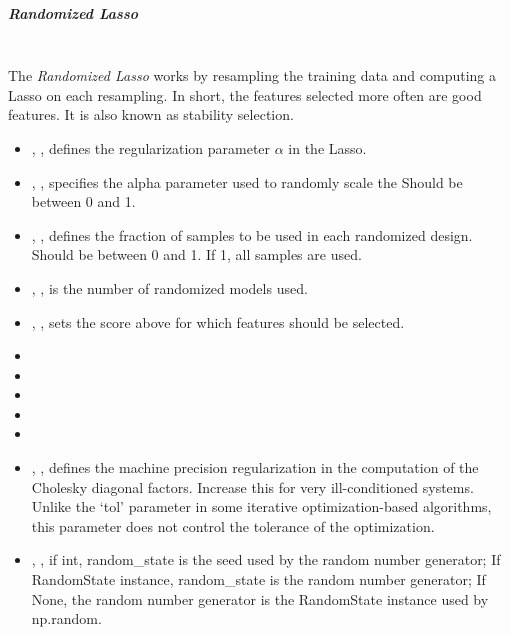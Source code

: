\subparagraph{Randomized Lasso}
\mbox{}
\\The \textit{Randomized Lasso} works by resampling the training data and
computing a Lasso on each resampling.
%
In short, the features selected more often are good features.
%
It is also known as stability selection.
%
\begin{itemize}
  \item {}, , defines the
  regularization parameter $\alpha$ in the Lasso.
  \item {}, , specifies the alpha
  parameter used to randomly scale the
  Should be between 0 and 1.
  \item {}, , defines
  the fraction of samples to be used in each randomized design.
  Should be between 0 and 1.
  If 1, all samples are used.
  \item {}, , is the number of
  randomized models used.
  \item {}, , sets
  the score above for which features should be selected.
  \item {}
  \item \verDescriptionB{}
  \item {}
  \item \precomputeDescription{}
  \item \maxIterDescription{}
  \item {}, , defines the machine
  precision regularization in the computation of the Cholesky diagonal factors.
  Increase this for very ill-conditioned systems.
  Unlike the `tol' parameter in some iterative optimization-based algorithms,
  this parameter does not control the tolerance of the optimization.
  \item {}, , if int, random\_state is the seed used by the random number
  generator; If RandomState instance, random\_state is the random
  number generator; If None, the random number generator is the RandomState
  instance used by np.random.
\end{itemize}

